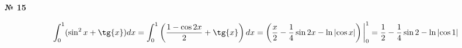\documentclass{article}
\begin{document}
\textbf{№ 15} 

$$ \int_{0}^{1} (\sin^2{x} + \tg{x}) dx 
= \int_{0}^{1} \left( \frac{1-\cos{2x}}{2} + \tg{x} \right) dx 
= \left( \frac{x}{2} - \frac{1}{4}\sin{2x} - \ln{\left| \cos{x} \right|} \right) \bigg\vert_{0}^{1} 
= \frac{1}{2} - \frac{1}{4}\sin{2} - \ln{\left| \cos{1} \right|} $$
\end{document}
